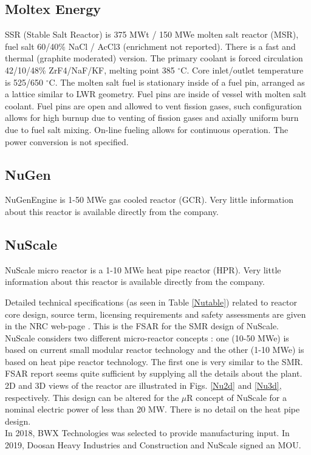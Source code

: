 \subsection{Moltex Energy}
SSR (Stable Salt Reactor) is 375 MWt / 150 MWe molten salt reactor (MSR), fuel salt 60/40\% NaCl / AcCl3 (enrichment  not  reported). There  is  a  fast  and  thermal  (graphite  moderated)  version. The primary  coolant  is forced circulation 42/10/48\% ZrF4/NaF/KF, melting point 385 $^{\circ}$C. Core inlet/outlet temperature is 525/650 $^{\circ}$C. The molten salt fuel is stationary inside of a fuel pin, arranged as a lattice similar to LWR geometry. Fuel pins are inside of vessel with molten salt coolant. Fuel pins are open and allowed to vent fission gases, such configuration allows for high burnup  due  to  venting  of  fission  gases  and  axially  uniform  burn  due  to fuel salt  mixing. On-line  fueling  allows  for continuous operation. The power conversion is not specified.

\subsection{NuGen}
NuGenEngine  is  1-50  MWe  gas  cooled  reactor  (GCR). Very  little  information  about  this  reactor  is available directly from the company.

\subsection{NuScale}
NuScale micro reactor is a 1-10 MWe heat pipe reactor (HPR). Very little information about this reactor is available directly from the company.

Detailed technical specifications (as seen in Table \ref{Nutable}) related to reactor core design, source term, licensing requirements and safety assessments are given in the NRC web-page \cite{nuscale_chapter_2018-1}. This is the \gls{FSAR} for the SMR design of NuScale. NuScale considers two different micro-reactor concepts \cite{nichol_cost_2019}: one (10-50 MWe) is based on current small modular reactor technology and the other (1-10 MWe) is based on heat pipe reactor technology. The first one is very similar to the SMR. FSAR report  seems quite sufficient by supplying all the details about the plant. 2D and 3D views of the reactor are illustrated in Figs. \ref{Nu2d} and \ref{Nu3d}, respectively. This design can be altered for the $\mu$R concept of NuScale for a nominal electric power of less than 20 MW. There is no detail on the heat pipe design.  \\
In 2018, BWX Technologies was selected to provide manufacturing input. In 2019, Doosan Heavy Industries and Construction and NuScale signed an MOU. 

